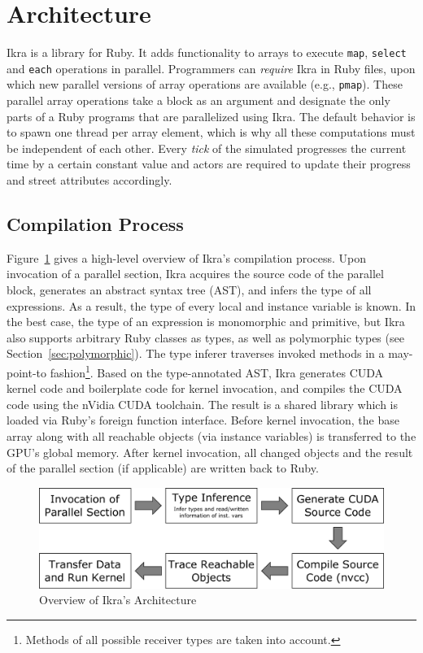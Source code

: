 \documentclass{sigplanconf}
\begin{document}
\section{Architecture}
Ikra is a library for Ruby. It adds functionality to arrays to execute \texttt{map}, \texttt{select} and \texttt{each} operations in parallel. Programmers can \emph{require} Ikra in Ruby files, upon which new parallel versions of array operations are available (e.g., \texttt{pmap}). These parallel array operations take a block as an argument and designate the only parts of a Ruby programs that are parallelized using Ikra. The default behavior is to spawn one thread per array element, which is why all these computations must be independent of each other. Every \emph{tick} of the simulated progresses the current time by a certain constant value and actors are required to update their progress and street attributes accordingly.

\subsection{Compilation Process}
Figure~\ref{fig:overview_arch} gives a high-level overview of Ikra's compilation process. Upon invocation of a parallel section, Ikra acquires the source code of the parallel block, generates an abstract syntax tree (AST), and infers the type of all expressions. As a result, the type of every local and instance variable is known. In the best case, the type of an expression is monomorphic and primitive, but Ikra also supports arbitrary Ruby classes as types, as well as polymorphic types (see Section~\ref{sec:polymorphic}). The type inferer traverses invoked methods in a may-point-to fashion\footnote{Methods of all possible receiver types are taken into account.}. Based on the type-annotated AST, Ikra generates CUDA kernel code and boilerplate code for kernel invocation, and compiles the CUDA code using the nVidia CUDA toolchain. The result is a shared library which is loaded via Ruby's foreign function interface. Before kernel invocation, the base array along with all reachable objects (via instance variables) is transferred to the GPU's global memory. After kernel invocation, all changed objects and the result of the parallel section (if applicable) are written back to Ruby.

\begin{figure}[!htp]
    \includegraphics[width=\columnwidth]{high_level_arch.pdf}
    \caption{Overview of Ikra's Architecture}
    \label{fig:overview_arch}
\end{figure}
\end{document}

